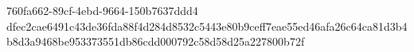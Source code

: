 760fa662-89cf-4ebd-9664-150b7637ddd4
dfec2cae6491c43de36fda88f4d284d8532c5443e80b9ceff7eae55ed46afa26c64ca81d3b4b8d3a9468be953373551db86cdd000792c58d58d25a227800b72f
